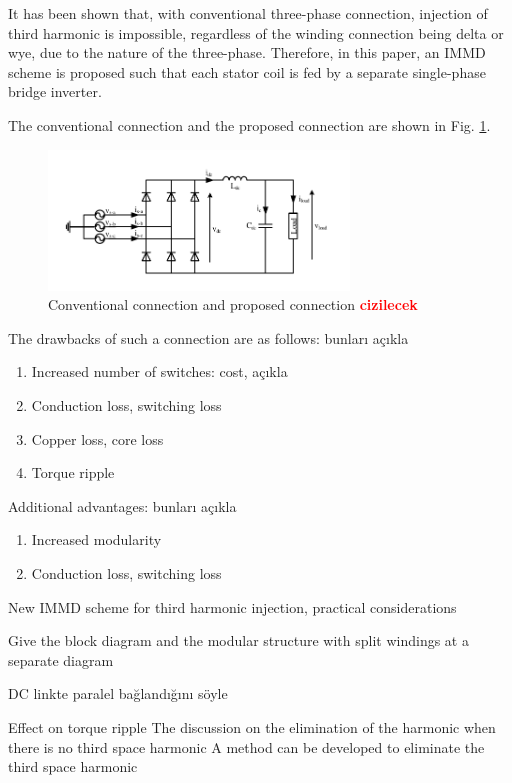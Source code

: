 \documentclass[conference,a4paper,twocolumn]{IEEEtran}
\begin{document}
It has been shown that, with conventional three-phase connection, injection of third harmonic is impossible, regardless of the winding connection being delta or wye, due to the nature of the three-phase. Therefore, in this paper, an IMMD scheme is proposed such that each stator coil is fed by a separate single-phase bridge inverter.

The conventional connection and the proposed connection are shown in Fig. \ref{fig:rect_circuit}.

\begin{figure}[htp]
  \centering
  \includegraphics[width=8cm]{images/rect_circuit}
  \caption{Conventional connection and proposed connection  \textbf{\textcolor{red}{cizilecek}}}
  \label{fig:rect_circuit}
\end{figure}

The drawbacks of such a connection are as follows: bunları açıkla

\begin{enumerate}
  \item Increased number of switches: cost, açıkla
  \item Conduction loss, switching loss
  \item Copper loss, core loss
  \item Torque ripple
\end{enumerate}

Additional advantages: bunları açıkla
\begin{enumerate}
  \item Increased modularity
  \item Conduction loss, switching loss
\end{enumerate}

New IMMD scheme for third harmonic injection, practical considerations

Give the block diagram and the modular structure with split windings at a separate diagram

DC linkte paralel bağlandığını söyle

Effect on torque ripple
The discussion on the elimination of the harmonic when there is no third space harmonic
A method can be developed to eliminate the third space harmonic
\end{document}
